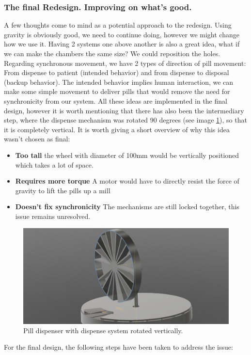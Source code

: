 \subsubsection{The final Redesign. Improving on what's good.}
A few thoughts come to mind as a potential approach to the redesign. Using gravity is obviously good, we need to continue doing, however we might change how we use it. Having 2 systems one above another is also a great idea, what if we can make the chambers the same size? We could reposition the holes. Regarding synchronous movement, we have 2 types of direction of pill movement: From dispense to patient (intended behavior) and from dispense to disposal (backup behavior). The intended behavior implies human interaction, we can make some simple movement to deliver pills that would remove the need for synchronicity from our system. All these ideas are implemented in the final design, however it is worth mentioning that there has also been the intermediary step, where the dispense mechanism was rotated 90 degrees (see image \ref{fig:screenshot4}), so that it is completely vertical. It is worth giving a short overview of why this idea wasn't chosen as final:
\begin{itemize}
	\item{\textbf{Too tall}} the wheel with diameter of 100mm would be vertically positioned which takes a lot of space.
	\item{\textbf{Requires more torque}} A motor would have to directly resist the force of gravity to lift the pills up a mill
	\item{\textbf{Doesn't fix synchronicity}} The mechanisms are still locked together, this issue remains unresolved.
\end{itemize}
\begin{figure}[]
	\centering
	\includegraphics[width=0.6\linewidth]{Figures/Screenshot_4}
	\caption[Vertical Pill Dispenser.]{Pill dispenser with dispense system rotated vertically.}
	\label{fig:screenshot4}
\end{figure}
\newpage
For the final design, the following steps have been taken to address the issue:
